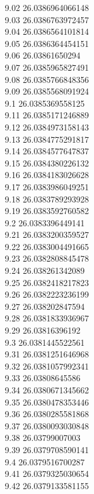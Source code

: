 {9.02	26.0386964066148\\
9.03	26.0386763972457\\
9.04	26.0386564101814\\
9.05	26.0386364454151\\
9.06	26.03861650294\\
9.07	26.0385965827491\\
9.08	26.0385766848356\\
9.09	26.0385568091924\\
9.1	26.0385369558125\\
9.11	26.0385171246889\\
9.12	26.0384973158143\\
9.13	26.0384775291817\\
9.14	26.0384577647837\\
9.15	26.0384380226132\\
9.16	26.0384183026628\\
9.17	26.0383986049251\\
9.18	26.0383789293928\\
9.19	26.0383592760582\\
9.2	26.0383396449141\\
9.21	26.0383200359527\\
9.22	26.0383004491665\\
9.23	26.0382808845478\\
9.24	26.038261342089\\
9.25	26.0382418217823\\
9.26	26.0382223236199\\
9.27	26.038202847594\\
9.28	26.0381833936967\\
9.29	26.03816396192\\
9.3	26.0381445522561\\
9.31	26.0381251646968\\
9.32	26.0381057992341\\
9.33	26.03808645586\\
9.34	26.0380671345662\\
9.35	26.0380478353446\\
9.36	26.0380285581868\\
9.37	26.0380093030848\\
9.38	26.03799007003\\
9.39	26.0379708590141\\
9.4	26.0379516700287\\
9.41	26.0379325030654\\
9.42	26.0379133581155\\
}
